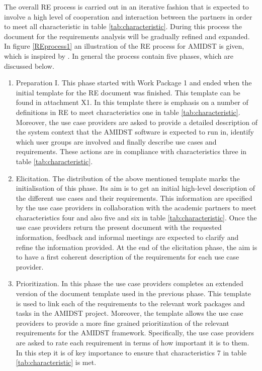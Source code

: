 \documentclass[11pt, oneside]{article}   	%
\begin{document}
The overall RE process is carried out in an iterative fashion that is expected to involve a high level of cooperation and interaction between the partners in order to meet all characteristic in table \ref{tab:characteristic}. During this process the document for the requirements analysis will be gradually refined and expanded. In figure \ref{REprocess1}  an illustration of the RE process for AMIDST is given, which is inspired by \cite{Ebe10}.  In general the process contain five phases, which are discussed below.
\begin{enumerate}
 \item Preparation I.  This phase started with Work Package 1 and ended when the initial template for the RE document was finished.  This template can be found in attachment X1. In this template there is emphasis on a number of definitions in RE to meet characteristics one in table \ref{tab:characteristic}.  Moreover, the use case providers are asked to provide a detailed description of the system context that the AMIDST software is expected to run in, identify which user groups are involved and finally describe use cases and requirements.  These actions are in compliance with characteristics three in table \ref{tab:characteristic}.  
\item Elicitation. The distribution of the above mentioned template marks the initialisation of this phase.  Its aim is to get an initial high-level description of the different use cases and their requirements. This information are specified by the use case providers in collaboration with the academic partners to meet characteristics four and also five and six in table \ref{tab:characteristic}.  Once the use case providers return the present document with the requested information, feedback and informal meetings are expected to clarify and refine the information provided.  At the end of the elicitation phase, the aim is to have a first coherent description of the requirements for each use case provider.
 \item Prioritization. In this phase the use case providers completes an extended version of the document template used in the previous phase. This template is used to link each of the requirements to the relevant work packages and tasks in the AMIDST project. Moreover, the template allows the use case providers to provide a more fine grained prioritization of the relevant requirements for the AMIDST framework.  Specifically, the use case providers are asked to rate each requirement in terms of how important it is to them.  In this step it is of key importance to ensure that characteristics 7 in table  \ref{tab:characteristic} is met.

\end{enumerate}
\end{document}
